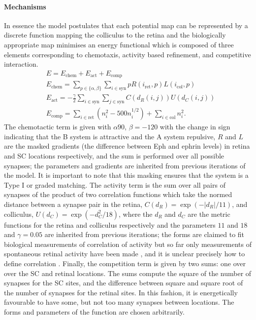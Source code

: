 \paragraph{Mechanisms}
In essence the model postulates that each potential map can be represented by a discrete function mapping the colliculus to the retina and the biologically appropriate map minimises an energy functional which is composed of three elements corresponding to chemotaxis, activity based refinement, and competitive interaction.
\begin{align}
&E = E_{\text{chem}} + E_{\text{act}}+E_{\text{comp}}\\	
&E_{\text{chem}} = \sum_{p \in \{\alpha,\beta\}}\sum_{i \in \text{syn}} pR(i_\text{ret},p)L(i_\text{col},p) \\
&E_{\text{act}} =- \frac{\gamma}{2} \sum_{i \in \text{syn}}\sum_{j \in \text{syn}} C(d_R(i, j))U(d_C(i, j))\\
&E_{\text{comp}} = \sum_{i\in \text{ret}} (n_i^2 - 500 n_i^{1/2}) + \sum_{i\in \text{col}} n_i^2.
\end{align}
The chemotactic term is given with $\alpha90$, $\beta=-120$ with the change in sign indicating that the B system is attractive and the A system repulsive, $R$ and $L$ are the masked gradients (the difference between Eph and ephrin levels) in retina and SC locations respectively, and the sum is performed over all possible synapses; the parameters and gradients are inherited from previous iterations of the model. It is important to note that this masking ensures that the system is a Type I or graded matching. The activity term is the sum over all pairs of synapses of the product of two correlation functions which take the normed distance between a synapse pair in the retina, $C(d_R) = \exp(-|d_R|/11)$, and colliculus, $U(d_C) = \exp(-d_C^2/18)$, where the $d_R$ and $d_C$ are the metric functions for the retina and colliculus respectively and the parameters $11$ and $18$ and $\gamma=0.05$ are inherited from previous iterations; the forms are claimed to fit biological measurements of correlation of activity but so far only measurements of spontaneous retinal activity have been made \cite{Stafford2009}, and it is unclear precisely how to define correlation \cite{Cutts2014-mn}. Finally, the competition term is given by two sums: one over over the SC and retinal locations. The sums compute the square of the number of synapses for the SC sites, and the difference between square and square root of the number of synapses for the retinal sites. In this fashion, it is energetically favourable to have some, but not too many synapses between locations. The forms and parameters of the function are chosen arbitrarily.


